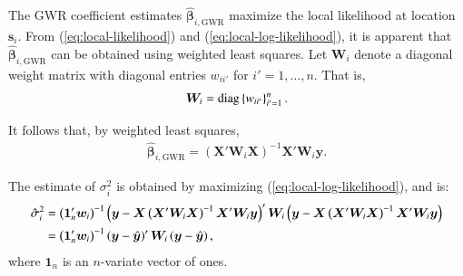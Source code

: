 \documentclass[authoryear, review, 11pt]{elsarticle}
\begin{document}
	The GWR coefficient estimates $\hat{\bm{\beta}}_{i,\text{GWR}}$ maximize the local likelihood at location $\bm{s}_i$. From (\ref{eq:local-likelihood}) and (\ref{eq:local-log-likelihood}), it is apparent that $\hat{\bm{\beta}}_{i,\text{GWR}}$ can be obtained using weighted least squares. Let $\bm{W}_i$ denote a diagonal weight matrix with diagonal entries $w_{ii'}$ for $i'=1, \dots, n$. That is,
	\begin{align}
		\bm{W}_i =  {\rm diag}\left\{w_{ii'}\right\}_{i' = 1}^n.
	\end{align}
	
	It follows that, by weighted least squares,
	\begin{align}
		\hat{\bm{\beta}}_{i, \text{GWR}} = \left( \bm{X}'\bm{W}_i\bm{X} \right)^{-1} \bm{X}'\bm{W}_i\bm{y}.
	\end{align}
	
	The estimate of $\sigma_i^2$ is obtained by maximizing (\ref{eq:local-log-likelihood}), and is:
	\begin{align}
		\hat{\sigma}^2_i &= \left(\bm{1}_n'\bm{w}_i \right)^{-1} \left(\bm{y}-\bm{X}\left(\bm{X}'\bm{W}_i\bm{X}\right)^{-1}\bm{X}'\bm{W}_i\bm{y}\right)' \bm{W}_i \left(\bm{y}-\bm{X}\left(\bm{X}'\bm{W}_i\bm{X}\right)^{-1}\bm{X}'\bm{W}_i\bm{y}\right) \notag \\
		&= \left(\bm{1}_n'\bm{w}_i \right)^{-1}  \left(\bm{y}-\hat{\bm{y}}\right)' \bm{W}_i \left(\bm{y}-\hat{\bm{y}}\right),
	\end{align}	
	where $\bm{1}_n$ is an $n$-variate vector of ones.
	
\end{document}
